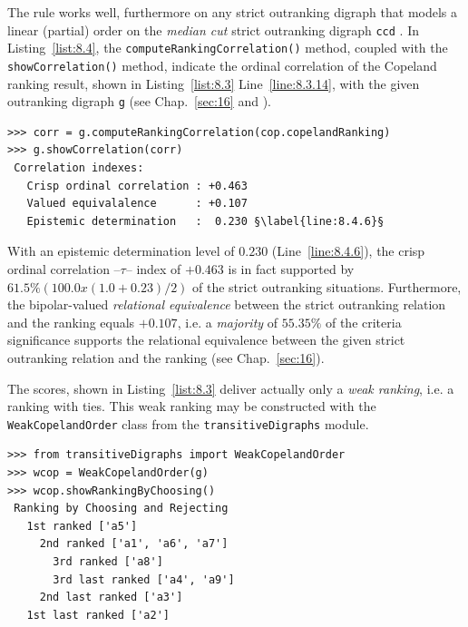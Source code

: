 The \Copeland rule works well, furthermore on any strict outranking digraph that models a linear (partial) order on the \emph{median cut} strict outranking digraph \texttt{ccd} \citep{DIA-2010}. In Listing~\vref{list:8.4}, the \texttt{computeRankingCorrela\-tion()} method, coupled with the \texttt{showCorrelation()} method, indicate the ordinal correlation of the {\sc Cope\-land} ranking result, shown in Listing~\vref{list:8.3} Line~\ref{line:8.3.14}, with the given outranking digraph \texttt{g} (see Chap.~\ref{sec:16} and \citealp{BIS-2012a}).
\begin{lstlisting}[caption={Checking the ordinal quality of the \Copeland ranking},label=list:8.4]
>>> corr = g.computeRankingCorrelation(cop.copelandRanking)
>>> g.showCorrelation(corr)
 Correlation indexes:
   Crisp ordinal correlation : +0.463
   Valued equivalalence      : +0.107
   Epistemic determination   :  0.230 §\label{line:8.4.6}§
\end{lstlisting}

With an epistemic determination level of $0.230$ (Line~\vref{line:8.4.6}), the crisp ordinal correlation --\Kendall $\tau$-- index of $+0.463$ is in fact supported by $61.5\% (100.0 x (1.0 + 0.23)/2)$ of the strict outranking situations. Furthermore, the bipolar-valued \emph{relational equivalence} between the strict outranking relation and the \Copeland ranking equals $+0.107$, i.e. a \emph{majority} of $55.35\%$ of the criteria significance supports the relational equivalence between the given strict outranking relation and the \Copeland ranking (see Chap.~\ref{sec:16}).

The \Copeland scores, shown in Listing~\vref{list:8.3} deliver actually only a \emph{weak ranking}, i.e. a ranking with ties. This weak ranking may be constructed with the \texttt{WeakCopelandOrder} class  from the \texttt{transitiveDigraphs} module.
\begin{lstlisting}[caption={Computing a weak \Copeland ranking},label=list:8.5]
>>> from transitiveDigraphs import WeakCopelandOrder
>>> wcop = WeakCopelandOrder(g)
>>> wcop.showRankingByChoosing()
 Ranking by Choosing and Rejecting
   1st ranked ['a5']
     2nd ranked ['a1', 'a6', 'a7']
       3rd ranked ['a8']
       3rd last ranked ['a4', 'a9']
     2nd last ranked ['a3']
   1st last ranked ['a2']
\end{lstlisting}

